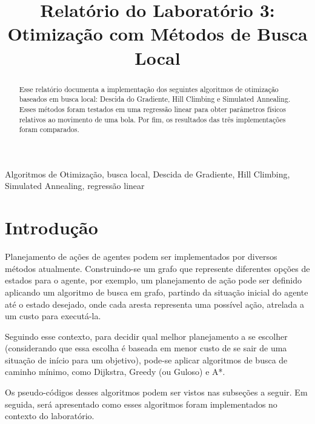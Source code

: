 \documentclass[conference]{IEEEtran}
\begin{document}
\title{Relatório do Laboratório 3: \\ Otimização com Métodos de Busca Local\\
}

\author{
}

\maketitle

\begin{abstract}
Esse relatório documenta a implementação dos seguintes algoritmos de otimização baseados em busca local: Descida do Gradiente, Hill Climbing e Simulated Annealing. Esses métodos foram testados em uma regressão linear para obter parâmetros físicos relativos ao movimento de uma bola. Por fim, os resultados das três implementações foram comparados.
\end{abstract}

\begin{IEEEkeywords}
Algoritmos de Otimização, busca local, Descida de Gradiente, Hill Climbing, Simulated Annealing, regressão linear
\end{IEEEkeywords}

\section{Introdução}
Planejamento de ações de agentes podem ser implementados por diversos métodos atualmente. Construindo-se um grafo que represente diferentes opções de estados para o agente, por exemplo, um planejamento de ação pode ser definido aplicando um algoritmo de busca em grafo, partindo da situação inicial do agente até o estado desejado, onde cada aresta representa uma possível ação, atrelada a um custo para executá-la.

Seguindo esse contexto, para decidir qual melhor planejamento a se escolher (considerando que essa escolha é baseada em menor custo de se sair de uma situação de início para um objetivo), pode-se aplicar algoritmos de busca de caminho mínimo, como Dijkstra, Greedy (ou Guloso) e A*. 

Os pseudo-códigos desses algoritmos podem ser vistos nas subseções a seguir. Em seguida, será apresentado como esses algoritmos foram implementados no contexto do laboratório.
\end{document}
